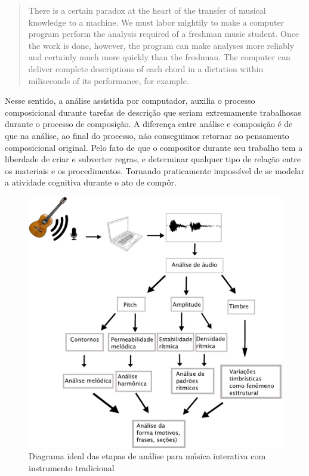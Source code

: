 \documentclass{ppgmus}
\begin{document}
\begin{quotation}
There is a certain paradox at the heart of the transfer of musical
knowledge to a machine. We must labor mightily to make a computer
program perform the analysis required of a freshman music student.
Once the work is done, however, the program can make analyses more reliably
and certainly much more quickly than the freshman. The computer can deliver 
complete descriptions of each chord in a dictation within miliseconds
of its performance, for example.
\end{quotation}


Nesse sentido, a análise assistida por computador, auxilia
o processo composicional durante tarefas de descrição que seriam
extremamente trabalhosas durante o processo de composição.
A diferença entre análise e composição é de que na análise, ao final do
processo, não conseguimos retornar ao pensamento composicional
original. Pelo fato de que o compositor durante seu trabalho tem a 
liberdade de criar e subverter regras, e determinar qualquer tipo de relação
entre os materiais e os procedimentos. Tornando praticamente impossível
de se modelar a atividade cognitiva durante o ato de compôr.

\begin{figure}
\includegraphics[scale=.3]{analise}
\caption{Diagrama ideal das etapas de análise para música interativa com instrumento tradicional}
\label{analise-geral}
\end{figure} 
\end{document}
